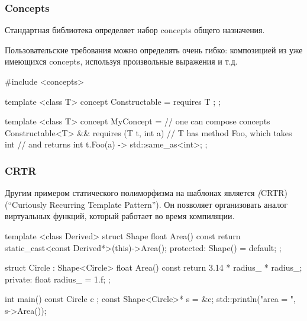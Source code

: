 \documentclass[compress, 8pt, aspectratio=169]{beamer}
\begin{document}
  \begin{frame}[fragile]

    \frametitle{Concepts}

    Стандартная библиотека определяет набор concepts общего назначения\footnotemark{}.


    Пользовательские требования можно определять очень гибко:
    композицией из уже имеющихся concepts, используя произвольные
    выражения и т.д.

    \begin{myinplacelisting}[minted language=cpp]
#include <concepts>

template <class T>
concept Constructable = requires {
    T {};
};

template <class T>
concept MyConcept =
    // one can compose concepts
    Constructable<T> &&
    requires (T t, int a) {
        // T has method Foo, which takes int
        // and returns int
        { t.Foo(a) } -> std::same_as<int>;
    };
    \end{myinplacelisting}

  \end{frame}

  \begin{frame}[fragile]

    \frametitle{CRTR}

    Другим примером статического полиморфизма на шаблонах\break
    является \textit(CRTR) (\enquote{Curiously Recurring Template Pattern}).
    Он позволяет организовать аналог виртуальных функций, который
    работает во время компиляции.

    \begin{myinplacelisting}[minted language=cpp]
template <class Derived>
struct Shape {
    float Area() const {
        return static_cast<const Derived*>(this)->Area();
    }
protected: Shape() = default;
};

struct Circle : Shape<Circle> {
    float Area() const { return 3.14 * radius_ * radius_; }
private: float radius_ = 1.f;
};

int main() {
    const Circle c {};
    const Shape<Circle>* s = &c;
    std::println("area = {}", s->Area());
}
    \end{myinplacelisting}
    
  \end{frame}
\end{document}
